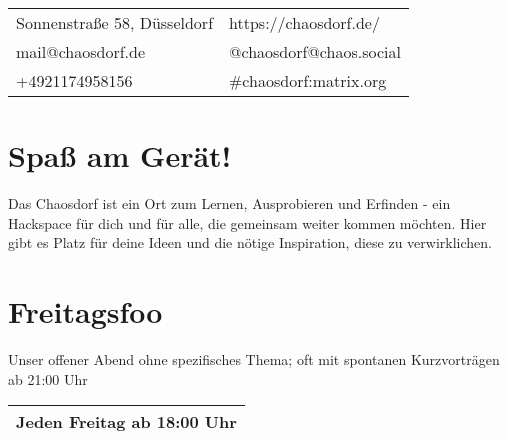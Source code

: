 \documentclass{article}
\begin{document}
    \begin{center}
        \thispagestyle{empty}
        \hspace*{1.5em}
        

        \vspace*{5em}
        \hspace*{3em}
        

        \vfill

        \begingroup
            \setlength{\tabcolsep}{10pt} %
            \renewcommand{\arraystretch}{2} %

            \begin{tabularx}{\textwidth}{ X X }
                Sonnenstraße 58, \newline 40227 Düsseldorf & \vfill https://chaosdorf.de/  \\
                mail@chaosdorf.de & @chaosdorf@chaos.social \\ 
                +4921174958156 & \#chaosdorf:matrix.org
            \end{tabularx}
        \endgroup
    \end{center}

    \newpage
    \thispagestyle{empty}

    \section*{Spaß am Gerät!}
    Das Chaosdorf ist ein Ort zum Lernen, Ausprobieren und Erfinden - ein
    Hackspace für dich und für alle, die gemeinsam weiter kommen möchten.
    Hier gibt es Platz für deine Ideen und die nötige Inspiration,
    diese zu verwirklichen.

    \vfill

    \section*{Freitagsfoo}
    Unser offener Abend ohne spezifisches Thema;
    oft mit spontanen Kurzvorträgen ab 21:00 Uhr

    \begin{tabular}{ c }
        \\
        \hline
        Jeden Freitag ab 18:00 Uhr \\
        \hline
    \end{tabular}
\end{document}
